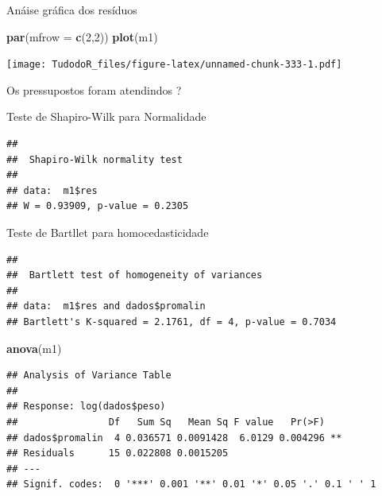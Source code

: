 \documentclass[
]{book}
\newenvironment{Shaded}{\begin{snugshade}}{\end{snugshade}}
\newcommand{\DataTypeTok}[1]{\textcolor[rgb]{0.13,0.29,0.53}{#1}}
\newcommand{\DecValTok}[1]{\textcolor[rgb]{0.00,0.00,0.81}{#1}}
\newcommand{\KeywordTok}[1]{\textcolor[rgb]{0.13,0.29,0.53}{\textbf{#1}}}
\newcommand{\NormalTok}[1]{#1}
\newcommand{\OperatorTok}[1]{\textcolor[rgb]{0.81,0.36,0.00}{\textbf{#1}}}
\begin{document}
Anáise gráfica dos resíduos

\begin{Shaded}
\begin{Highlighting}[]
\KeywordTok{par}\NormalTok{(}\DataTypeTok{mfrow =} \KeywordTok{c}\NormalTok{(}\DecValTok{2}\NormalTok{,}\DecValTok{2}\NormalTok{))}
\KeywordTok{plot}\NormalTok{(m1)}
\end{Highlighting}
\end{Shaded}

\texttt{[image: TudodoR\_files/figure-latex/unnamed-chunk-333-1.pdf]}

Os pressupostos foram atendindos ?

Teste de Shapiro-Wilk para Normalidade

\begin{Shaded}
\end{Shaded}

\begin{verbatim}
## 
##  Shapiro-Wilk normality test
## 
## data:  m1$res
## W = 0.93909, p-value = 0.2305
\end{verbatim}

Teste de Bartllet para homocedasticidade

\begin{Shaded}
\end{Shaded}

\begin{verbatim}
## 
##  Bartlett test of homogeneity of variances
## 
## data:  m1$res and dados$promalin
## Bartlett's K-squared = 2.1761, df = 4, p-value = 0.7034
\end{verbatim}

\begin{Shaded}
\begin{Highlighting}[]
\KeywordTok{anova}\NormalTok{(m1)}
\end{Highlighting}
\end{Shaded}

\begin{verbatim}
## Analysis of Variance Table
## 
## Response: log(dados$peso)
##                Df   Sum Sq   Mean Sq F value   Pr(>F)   
## dados$promalin  4 0.036571 0.0091428  6.0129 0.004296 **
## Residuals      15 0.022808 0.0015205                    
## ---
## Signif. codes:  0 '***' 0.001 '**' 0.01 '*' 0.05 '.' 0.1 ' ' 1
\end{verbatim}
\end{document}
